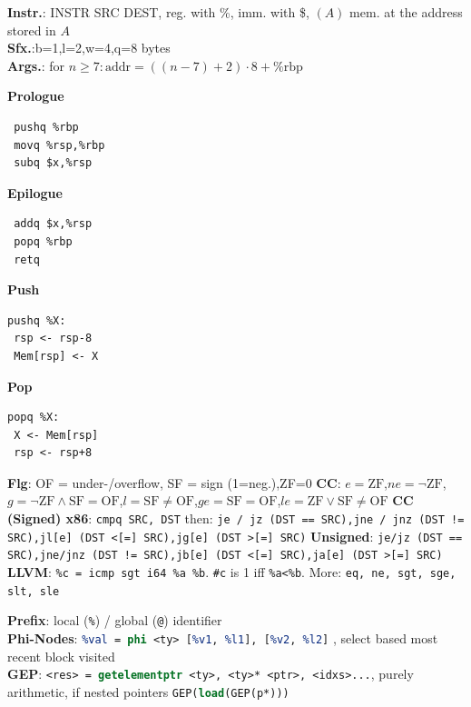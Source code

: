 




\textbf{Instr.}: INSTR SRC DEST, reg. with \%, imm. with \$, $(A)$ mem. at the address stored in $A$ \\
\textbf{Sfx.}:b=1,l=2,w=4,q=8 bytes\\
\textbf{Args.}: for $n\ge 7:\text{addr}=((n-7)+2)\cdot 8 + \%\text{rbp}$
\begin{multicols}{4}
\textbf{Prologue}
\begin{lstlisting}
 pushq %rbp
 movq %rsp,%rbp
 subq $x,%rsp
\end{lstlisting}
\columnbreak
\textbf{Epilogue}
\begin{lstlisting}
 addq $x,%rsp
 popq %rbp
 retq
\end{lstlisting}
\columnbreak
\textbf{Push}\\
\begin{lstlisting}
pushq %X:
 rsp <- rsp-8
 Mem[rsp] <- X
\end{lstlisting}
\columnbreak
\textbf{Pop}\\
\begin{lstlisting}
popq %X:
 X <- Mem[rsp]
 rsp <- rsp+8 
\end{lstlisting}
\end{multicols}
\textbf{Flg}: OF = under-/overflow, SF = sign (1=neg.),ZF=0
\textbf{CC}: $e=\text{ZF}$,$ne=\neg\text{ZF}$, $g=\neg \text{ZF}\wedge \text{SF}{=}\text{OF}$,$l=\text{SF}\neq \text{OF}$,$ge=\text{SF}=\text{OF}$,$le=\text{ZF}\vee\text{SF} \neq \text{OF}$
\textbf{CC (Signed) x86}: \texttt{cmpq SRC, DST} then: \texttt{je / jz (DST == SRC),jne / jnz (DST != SRC),jl[e] (DST <[=]  SRC),jg[e] (DST >[=]  SRC)}
\textbf{Unsigned}: \texttt{je/jz (DST == SRC),jne/jnz (DST != SRC),jb[e] (DST <[=] SRC),ja[e] (DST >[=] SRC)}\\
\textbf{LLVM}: 
\texttt{\%c = icmp sgt i64 \%a \%b}. \texttt{\#c} is 1 iff \texttt{\%a<\%b}. More: \texttt{eq, ne, sgt, sge, slt, sle} 


\textbf{Prefix}: local (\texttt{\%}) / global (\texttt{@}) identifier\\
\textbf{Phi-Nodes}: \lstinline[language=llvm]{%val = phi <ty> [%v1, %l1], [%v2, %l2]}
, select based most recent block visited\\ 
\textbf{GEP}:  \lstinline[language=llvm]{<res> = getelementptr <ty>, <ty>* <ptr>, <idxs>...},
purely arithmetic, if nested pointers \lstinline[language=llvm]{GEP(load(GEP(p*)))} \\


